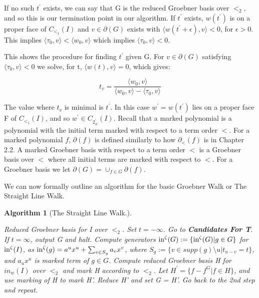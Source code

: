 \documentclass[12pt,a4paper]{report}
\newtheorem{algorithm}{Algorithm}
\begin{document}
If no such $t^{'}$ exists, we can say that G is the reduced Groebner basis over $<_{2}$, and so this is our termination point in our algorithm. If $t^{'}$ exists, $w(t^{'})$ is on a proper face of $C_{{<}_{1}} (I)$ and $v \in \partial (G)$ exists with $\langle w (t^{'} + \epsilon), v \rangle < 0$, for $\epsilon > 0$. This implies $\langle \tau_{0}, v \rangle < \langle w_{0}, v \rangle$ which implies $\langle \tau_{0}, v \rangle < 0$.

This shows the procedure for finding $t^{'}$ given G. For $v \in \partial (G)$ satisfying $\langle \tau_{0}, v \rangle < 0$ we solve, for t, $\langle w(t), v \rangle = 0$, which gives:

\begin{equation*}
    t_{v} = \frac{\langle w_{0}, v \rangle}{\langle w_{0}, v \rangle - \langle \tau_{0}, v \rangle}
\end{equation*}

The value where $t_{v}$ is minimal is $t^{'}$. In this case $w^{'} = w(t^{'})$ lies on a proper face F of $C_{{<}_{1}} (I)$, and so $w^{'} \in C_{{2}_w^{'}} (I)$. Recall that a marked polynomial is a polynomial with the initial term marked with respect to a term order $<$. For a marked polynomial $f$, $\partial (f)$ is defined similarly to how $\partial _{<} (f)$ is in Chapter 2.2. A marked Groebner basis with respect to a term order $<$ is a Groebner basis over $<$ where all initial terms are marked with respect to $<$. For a Groebner basis we let $\partial (G) = \cup_{f \in G} \partial (f)$.  

We can now formally outline an algorithm for the basic Groebner Walk or The Straight Line Walk. 



\begin{algorithm}[The Straight Line Walk.]\
 \begin{algorithmic}[1]
    \ENSURE Reduced Groebner basis for I over $<_{2}$.
    \STATE Set $t = - \infty$.
    \STATE Go to \textbf{Candidates For T}. If $t = \infty$, output G and halt.
    \STATE Compute generators $\operatorname{in}^{\zeta} (G) := \{ \operatorname{in}^{\zeta} (G) | g \in G \}$ for $\operatorname{in}^{\zeta} (I)$, as $\operatorname{in}^{\zeta} (g) = a^{u} x^{u} + \sum_{v \in S_{g}} a_{v} x^{v}$, where $S_{g} := \{ v \in supp(g) \setminus {u} | t_{u - v} = t\}$, and $a_{u} x^{u}$ is marked term of $g \in G$.
    \STATE Compute reduced Groebner basis H for $in_{w} (I)$ over $<_{2}$ and mark H according to $<_{2}$.
    \STATE Let $H^{'} = \{f - f^{G} | f \in H\}$, and use marking of H to mark H'.
    \STATE Reduce H' and set G = H'.
    \STATE Go back to the 2nd step and repeat.
\end{algorithmic}
\end{algorithm}
\end{document}
